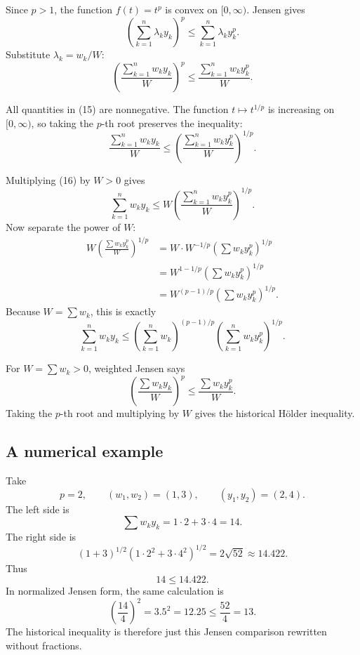\documentclass[11pt]{article}
\begin{document}
\begin{solutionBox}[Step 2: apply Jensen to \(f(t)=t^p\)]
Since \(p>1\), the function \(f(t)=t^p\) is convex on \([0,\infty)\). Jensen gives
\[
 \left(\sum_{k=1}^{n}\lambda_ky_k\right)^p
 \leq
 \sum_{k=1}^{n}\lambda_ky_k^p.
 \tag{14}
\]
Substitute \(\lambda_k=w_k/W\):
\[
 \left(\frac{\sum_{k=1}^{n}w_ky_k}{W}\right)^p
 \leq
 \frac{\sum_{k=1}^{n}w_ky_k^p}{W}.
 \tag{15}
\]
\end{solutionBox}

\begin{solutionBox}
All quantities in (15) are nonnegative. The function \(t\mapsto t^{1/p}\) is increasing on \([0,\infty)\), so taking the \(p\)-th root preserves the inequality:
\[
 \frac{\sum_{k=1}^{n}w_ky_k}{W}
 \leq
 \left(\frac{\sum_{k=1}^{n}w_ky_k^p}{W}\right)^{1/p}.
 \tag{16}
\]
\end{solutionBox}

\begin{solutionBox}
Multiplying (16) by \(W>0\) gives
\[
 \sum_{k=1}^{n}w_ky_k
 \leq
 W\left(\frac{\sum_{k=1}^{n}w_ky_k^p}{W}\right)^{1/p}.
 \tag{17}
\]
Now separate the power of \(W\):
\[
\begin{aligned}
 W\left(\frac{\sum w_ky_k^p}{W}\right)^{1/p}
 &=W\cdot W^{-1/p}\left(\sum w_ky_k^p\right)^{1/p}\\
 &=W^{1-1/p}\left(\sum w_ky_k^p\right)^{1/p}\\
 &=W^{(p-1)/p}\left(\sum w_ky_k^p\right)^{1/p}.
\end{aligned}
 \tag{18}
\]
Because \(W=\sum w_k\), this is exactly
\[
 \boxed{\displaystyle
 \sum_{k=1}^{n}w_ky_k
 \leq
 \left(\sum_{k=1}^{n}w_k\right)^{(p-1)/p}
 \left(\sum_{k=1}^{n}w_ky_k^p\right)^{1/p}.}
\]
\end{solutionBox}

\begin{ideaBox}
For \(W=\sum w_k>0\), weighted Jensen says
\[
 \left(\frac{\sum w_ky_k}{W}\right)^p
 \leq
 \frac{\sum w_ky_k^p}{W}.
\]
Taking the \(p\)-th root and multiplying by \(W\) gives the historical H\"older inequality.
\end{ideaBox}

\subsection{A numerical example}

Take
\[
 p=2,
 \qquad
 (w_1,w_2)=(1,3),
 \qquad
 (y_1,y_2)=(2,4).
\]
The left side is
\[
 \sum w_ky_k=1\cdot2+3\cdot4=14.
\]
The right side is
\[
 \left(1+3\right)^{1/2}
 \left(1\cdot2^2+3\cdot4^2\right)^{1/2}
 =2\sqrt{52}\approx14.422.
\]
Thus
\[
 14\leq14.422.
\]
In normalized Jensen form, the same calculation is
\[
 \left(\frac{14}{4}\right)^2=3.5^2=12.25
 \leq
 \frac{52}{4}=13.
\]
The historical inequality is therefore just this Jensen comparison rewritten without fractions.
\end{document}
